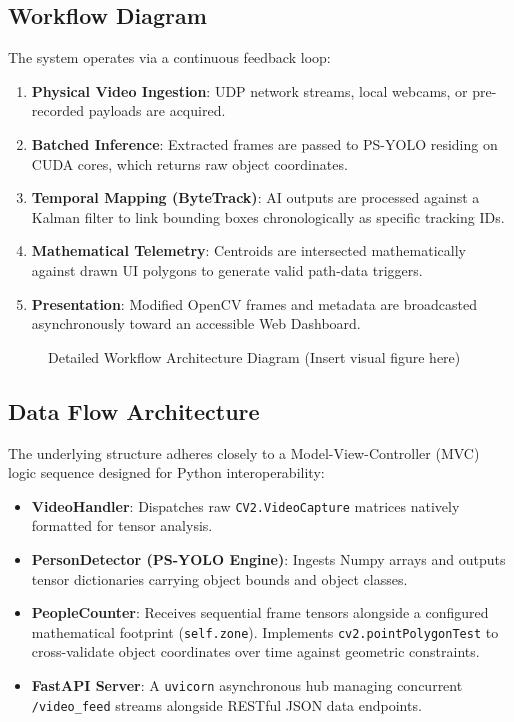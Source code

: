 \documentclass[11pt,a4paper]{article}
\begin{document}
\subsection{Workflow Diagram}
The system operates via a continuous feedback loop:
\begin{enumerate}
    \item \textbf{Physical Video Ingestion}: UDP network streams, local webcams, or pre-recorded payloads are acquired.
    \item \textbf{Batched Inference}: Extracted frames are passed to PS-YOLO residing on CUDA cores, which returns raw object coordinates.
    \item \textbf{Temporal Mapping (ByteTrack)}: AI outputs are processed against a Kalman filter to link bounding boxes chronologically as specific tracking IDs.
    \item \textbf{Mathematical Telemetry}: Centroids are intersected mathematically against drawn UI polygons to generate valid path-data triggers.
    \item \textbf{Presentation}: Modified OpenCV frames and metadata are broadcasted asynchronously toward an accessible Web Dashboard.
\end{enumerate}

\begin{figure}[htbp]
    \centering
    \caption{Detailed Workflow Architecture Diagram (Insert visual figure here)}
    \label{fig:workflow}
\end{figure}

\subsection{Data Flow Architecture}
The underlying structure adheres closely to a Model-View-Controller (MVC) logic sequence designed for Python interoperability:
\begin{itemize}
    \item \textbf{VideoHandler}: Dispatches raw \texttt{CV2.VideoCapture} matrices natively formatted for tensor analysis.
    \item \textbf{PersonDetector (PS-YOLO Engine)}: Ingests Numpy arrays and outputs tensor dictionaries carrying object bounds and object classes.
    \item \textbf{PeopleCounter}: Receives sequential frame tensors alongside a configured mathematical footprint (\texttt{self.zone}). Implements \texttt{cv2.pointPolygonTest} to cross-validate object coordinates over time against geometric constraints.
    \item \textbf{FastAPI Server}: A \texttt{uvicorn} asynchronous hub managing concurrent \texttt{/video\_feed} streams alongside RESTful JSON data endpoints.
\end{itemize}
\end{document}
